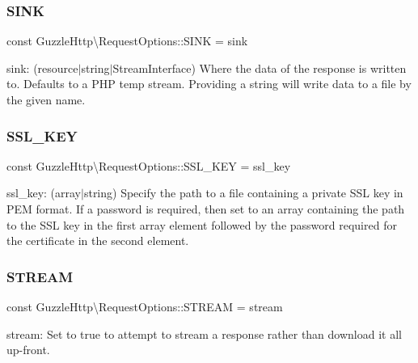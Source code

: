 \subsubsection{\texorpdfstring{S\+I\+NK}{SINK}}
{\footnotesize\ttfamily const Guzzle\+Http\textbackslash{}\+Request\+Options\+::\+S\+I\+NK = \textquotesingle{}sink\textquotesingle{}}

sink\+: (resource$\vert$string$\vert$\+Stream\+Interface) Where the data of the response is written to. Defaults to a P\+HP temp stream. Providing a string will write data to a file by the given name. \mbox{\label{classGuzzleHttp_1_1RequestOptions_ad321b0701e6ccbe7008f508d534667c5}} 
\subsubsection{\texorpdfstring{S\+S\+L\+\_\+\+K\+EY}{SSL\_KEY}}
{\footnotesize\ttfamily const Guzzle\+Http\textbackslash{}\+Request\+Options\+::\+S\+S\+L\+\_\+\+K\+EY = \textquotesingle{}ssl\+\_\+key\textquotesingle{}}

ssl\+\_\+key\+: (array$\vert$string) Specify the path to a file containing a private S\+SL key in P\+EM format. If a password is required, then set to an array containing the path to the S\+SL key in the first array element followed by the password required for the certificate in the second element. \mbox{\label{classGuzzleHttp_1_1RequestOptions_a7b6e1e5587ec5fe7cd7c41f53d84ad81}} 
\subsubsection{\texorpdfstring{S\+T\+R\+E\+AM}{STREAM}}
{\footnotesize\ttfamily const Guzzle\+Http\textbackslash{}\+Request\+Options\+::\+S\+T\+R\+E\+AM = \textquotesingle{}stream\textquotesingle{}}

stream\+: Set to true to attempt to stream a response rather than download it all up-\/front. \mbox{\label{classGuzzleHttp_1_1RequestOptions_adfd8f46ea8f924f73f15dbad7a46d351}} 
